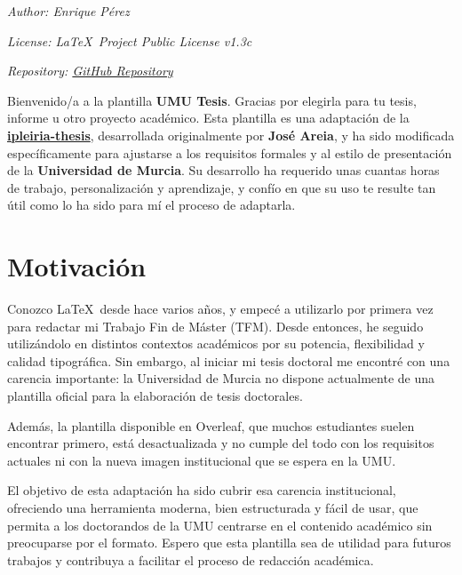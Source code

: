
{
\parindent0pt

\textit{Author: Enrique Pérez}

\textit{License: \LaTeX~Project Public License v1.3c}

\textit{Repository: \href{https://github.com/enriiquee/umu-thesis}{GitHub Repository}}

Bienvenido/a a la plantilla \textcolor{maincolor}{\textbf{UMU Tesis}}. Gracias por elegirla para tu tesis, informe u otro proyecto académico. Esta plantilla es una adaptación de la \textbf{\href{https://github.com/joseareia/ipleiria-thesis}{ipleiria-thesis}}, desarrollada originalmente por \textbf{José Areia}, y ha sido modificada específicamente para ajustarse a los requisitos formales y al estilo de presentación de la \textbf{Universidad de Murcia}. Su desarrollo ha requerido unas cuantas horas de trabajo, personalización y aprendizaje, y confío en que su uso te resulte tan útil como lo ha sido para mí el proceso de adaptarla.

\section{Motivación}
Conozco \LaTeX~desde hace varios años, y empecé a utilizarlo por primera vez para redactar mi Trabajo Fin de Máster (TFM). Desde entonces, he seguido utilizándolo en distintos contextos académicos por su potencia, flexibilidad y calidad tipográfica. Sin embargo, al iniciar mi tesis doctoral me encontré con una carencia importante: la Universidad de Murcia no dispone actualmente de una plantilla oficial para la elaboración de tesis doctorales.

Además, la plantilla disponible en Overleaf, que muchos estudiantes suelen encontrar primero, está desactualizada y no cumple del todo con los requisitos actuales ni con la nueva imagen institucional que se espera en la UMU. 

El objetivo de esta adaptación ha sido cubrir esa carencia institucional, ofreciendo una herramienta moderna, bien estructurada y fácil de usar, que permita a los doctorandos de la UMU centrarse en el contenido académico sin preocuparse por el formato. Espero que esta plantilla sea de utilidad para futuros trabajos y contribuya a facilitar el proceso de redacción académica.

}
